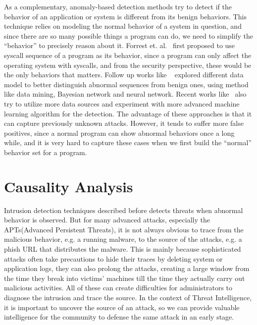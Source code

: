 As a complementary, anomaly-based detection methods try to detect if
the behavior of an application or system is different from its benign
behaviors. This technique relies on modeling the normal behavior of a 
system in question, and since there are so many possible things a program 
can do, we need to simplify the ``behavior'' to precisely reason about 
it. Forrest et. al.~\cite{forrest1996sense} first proposed to use
syscall sequence of a program as its behavior, since a program can only
affect the operating system with syscalls, and from the security 
perspective, these would be the only behaviors that matters. Follow up
works like ~\cite{lee1998data, warrender1999detecting, mutz2006anomalous}
explored different data model to better distinguish abnormal sequences
from benign ones, using method like data mining, Bayesian network and 
neural network. Recent works like~\cite{du2017deeplog} also try to 
utilize more data sources and experiment with more advanced machine
learning algorithm for the detection. The advantage of these approaches 
is that it can capture previously unknown attacks. However, it tends
to suffer more false positives, since a normal program can show abnormal
behaviors once a long while, and it is very hard to capture these
cases when we first build the ``normal'' behavior set for a program.

\section{Causality Analysis}
Intrusion detection techniques described before detects threats 
when abnormal behavior is observed. But for many advanced 
attacks, especially the APTs(Advanced Persistent Threats), it 
is not always obvious to trace from the malicious behavior, e.g.
a running malware, to the source of the attacks, e.g. a phish 
URL that distributes the malware. This is mainly because sophisticated
attacks often take precautions to hide their traces by deleting
system or application logs, they can also prolong the attacks, 
creating a large window from the time they break into victims' 
machines till the time they actually carry out malicious activities. 
All of these can create difficulties for administrators to diagnose
the intrusion and trace the source. In the context of Threat 
Intelligence, it is important to uncover the source of 
an attack, so we can provide valuable intelligence for the community 
to defense the same attack in an early stage.

